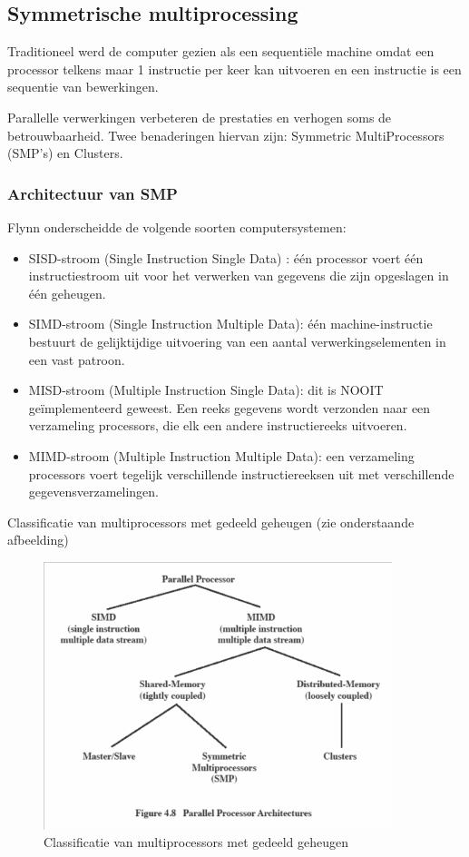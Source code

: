 \subsection{Symmetrische multiprocessing}

Traditioneel werd de computer gezien als een sequentiële machine omdat een processor telkens maar 1 instructie per keer kan uitvoeren en een instructie is een sequentie van bewerkingen.

Parallelle verwerkingen verbeteren de prestaties en verhogen soms de betrouwbaarheid. Twee benaderingen hiervan zijn: Symmetric MultiProcessors (SMP’s) en Clusters.


\subsubsection{Architectuur van SMP}

Flynn onderscheidde de volgende soorten computersystemen:

\begin{itemize}
\item SISD-stroom (Single Instruction Single Data) : één processor voert één instructiestroom uit voor het verwerken van gegevens die zijn opgeslagen in één geheugen.
\item SIMD-stroom (Single Instruction Multiple Data): één machine-instructie bestuurt de gelijktijdige uitvoering van een aantal verwerkingselementen in een vast patroon.
\item MISD-stroom (Multiple Instruction Single Data): dit is NOOIT geïmplementeerd geweest. Een reeks gegevens wordt verzonden naar een verzameling processors, die elk een andere instructiereeks uitvoeren.
\item MIMD-stroom (Multiple Instruction Multiple Data): een verzameling processors voert tegelijk verschillende instructiereeksen uit met verschillende gegevensverzamelingen.
\end{itemize}

Classificatie van multiprocessors met gedeeld geheugen (zie onderstaande afbeelding)

\begin{figure}[htp]
    \centering
            \includegraphics[width=4in]{img/classificatiemultiprocessors.png}
        \caption{Classificatie van multiprocessors met gedeeld geheugen}
    \label{fig:Classificatie van multiprocessors met gedeeld geheugen}
\end{figure}
 
